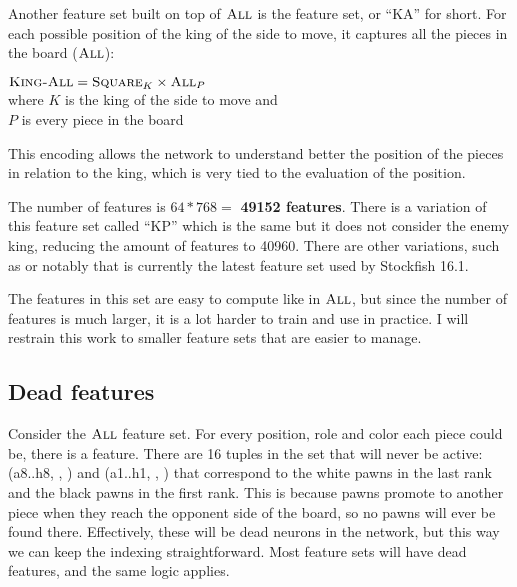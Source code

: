 \subsubsection{\mdseries{}}

Another feature set built on top of $\textsc{All}$ is the  feature set, or \enquote{KA} for short. For each possible position of the king of the side to move, it captures all the pieces in the board ($\textsc{All}$):

\begin{center}
    $\textsc{King-All} = \textsc{Square}_{K} \times \textsc{All}_{P}$ \\
    where $K$ is the king of the side to move and\\
    $P$ is every piece in the board \\
\end{center}

This encoding allows the network to understand better the position of the pieces in relation to the king, which is very tied to the evaluation of the position.

The number of features is $64*768=$ \textbf{49152 features}. There is a variation of this feature set called \enquote{KP} which is the same but it does not consider the enemy king, reducing the amount of features to 40960. There are other variations, such as  or notably  that is currently the latest feature set used by Stockfish 16.1.

The features in this set are easy to compute like in $\textsc{All}$, but since the number of features is much larger, it is a lot harder to train and use in practice. I will restrain this work to smaller feature sets that are easier to manage.

\subsection{Dead features}

Consider the $\textsc{All}$ feature set. For every position, role and color each piece could be, there is a feature. There are 16 tuples in the set that will never be active: (a8..h8, \sympawn, \white) and (a1..h1, \sympawn, \black) that correspond to the white pawns in the last rank and the black pawns in the first rank. This is because pawns promote to another piece when they reach the opponent side of the board, so no pawns will ever be found there. Effectively, these will be dead neurons in the network, but this way we can keep the indexing straightforward. Most feature sets will have dead features, and the same logic applies.

